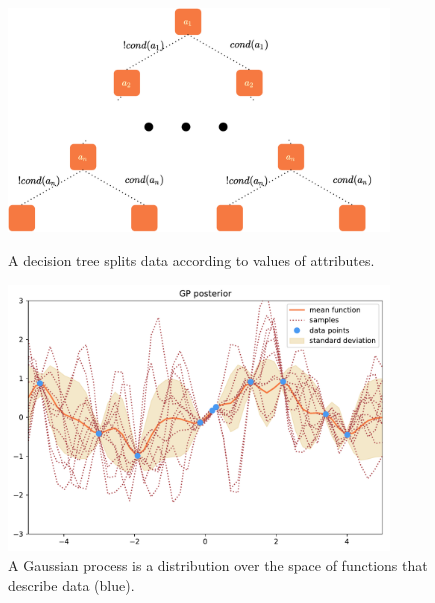 \documentclass[a4paper,cleardoubleempty,BCOR1cm, 11pt]{report}
\begin{document}
\begin{figure}
	\centering
	\begin{minipage}[t]{0.45\textwidth}
		\centering
		\includegraphics[width=0.9\textwidth,height=0.16\textheight]{images/decisiontree.pdf} 
		\caption{A decision tree splits data according to values of attributes.}
		\label{fig:decision_tree}
	\end{minipage}\hfill
	\begin{minipage}[t]{0.45\textwidth}
		\centering
		\includegraphics[width=0.9\textwidth,height=0.16\textheight]{images/post.pdf}
		\caption{A Gaussian process is a distribution over the space of functions that describe data (blue).}
	\end{minipage}
\end{figure}
\end{document}
